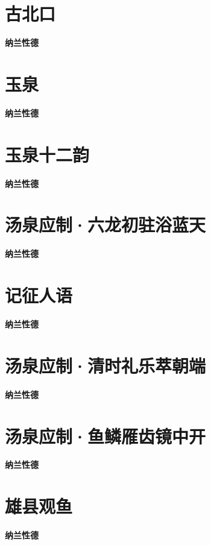 \documentclass[12pt,a4paper]{ctexbook}
\begin{document}
\section{古北口}
\textbf{纳兰性德}\par\vspace{0.5em}

\section{玉泉}
\textbf{纳兰性德}\par\vspace{0.5em}

\section{玉泉十二韵}
\textbf{纳兰性德}\par\vspace{0.5em}

\section{汤泉应制·六龙初驻浴蓝天}
\textbf{纳兰性德}\par\vspace{0.5em}

\section{记征人语}
\textbf{纳兰性德}\par\vspace{0.5em}

\section{汤泉应制·清时礼乐萃朝端}
\textbf{纳兰性德}\par\vspace{0.5em}

\section{汤泉应制·鱼鳞雁齿镜中开}
\textbf{纳兰性德}\par\vspace{0.5em}

\section{雄县观鱼}
\textbf{纳兰性德}\par\vspace{0.5em}
\end{document}
